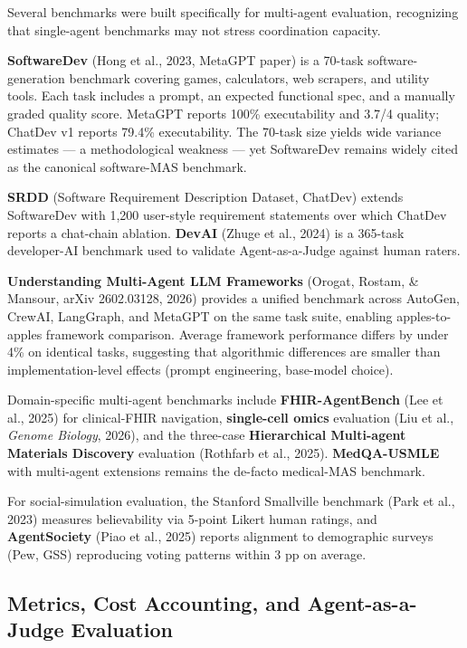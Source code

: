 Several benchmarks were built specifically for multi-agent evaluation, recognizing that single-agent benchmarks may not stress coordination capacity.

\textbf{SoftwareDev} (Hong et al., 2023, MetaGPT paper) is a 70-task software-generation benchmark covering games, calculators, web scrapers, and utility tools. Each task includes a prompt, an expected functional spec, and a manually graded quality score. MetaGPT reports 100\% executability and 3.7/4 quality; ChatDev v1 reports 79.4\% executability. The 70-task size yields wide variance estimates --- a methodological weakness --- yet SoftwareDev remains widely cited as the canonical software-MAS benchmark.

\textbf{SRDD} (Software Requirement Description Dataset, ChatDev) extends SoftwareDev with 1,200 user-style requirement statements over which ChatDev reports a chat-chain ablation. \textbf{DevAI} (Zhuge et al., 2024) is a 365-task developer-AI benchmark used to validate Agent-as-a-Judge against human raters.

\textbf{Understanding Multi-Agent LLM Frameworks} (Orogat, Rostam, \& Mansour, arXiv 2602.03128, 2026) provides a unified benchmark across AutoGen, CrewAI, LangGraph, and MetaGPT on the same task suite, enabling apples-to-apples framework comparison. Average framework performance differs by under 4\% on identical tasks, suggesting that algorithmic differences are smaller than implementation-level effects (prompt engineering, base-model choice).

Domain-specific multi-agent benchmarks include \textbf{FHIR-AgentBench} (Lee et al., 2025) for clinical-FHIR navigation, \textbf{single-cell omics} evaluation (Liu et al., \emph{Genome Biology}, 2026), and the three-case \textbf{Hierarchical Multi-agent Materials Discovery} evaluation (Rothfarb et al., 2025). \textbf{MedQA-USMLE} with multi-agent extensions remains the de-facto medical-MAS benchmark.

For social-simulation evaluation, the Stanford Smallville benchmark (Park et al., 2023) measures believability via 5-point Likert human ratings, and \textbf{AgentSociety} (Piao et al., 2025) reports alignment to demographic surveys (Pew, GSS) reproducing voting patterns within 3 pp on average.

\subsection{Metrics, Cost Accounting, and Agent-as-a-Judge Evaluation}\label{metrics-cost-accounting-and-agent-as-a-judge-evaluation}

